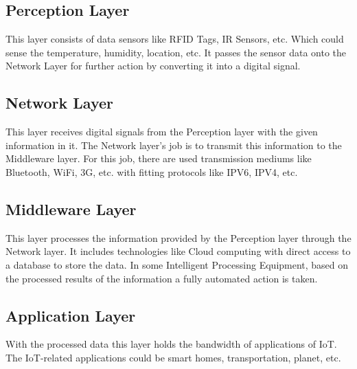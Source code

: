 \documentclass[twoside,twocolumn]{article}
\begin{document}
    \subsection{Perception Layer}
        \noindent This layer consists of data sensors like RFID Tags, IR Sensors, etc. Which could sense the temperature, humidity, location, etc. It passes the sensor data onto the Network Layer for further action by converting it into a digital signal.
    \subsection{Network Layer}
        \noindent This layer receives digital signals from the Perception layer with the given information in it. The Network layer's job is to transmit this information to the Middleware layer. For this job, there are used transmission mediums like Bluetooth, WiFi, 3G, etc. with fitting protocols like IPV6, IPV4, etc.
    \subsection{Middleware Layer}
        \noindent This layer processes the information provided by the Perception layer through the Network layer. It includes technologies like Cloud computing with direct access to a database to store the data. In some Intelligent Processing Equipment, based on the processed results of the information a fully automated action is taken.
    \subsection{Application Layer}
        \noindent With the processed data this layer holds the bandwidth of applications of IoT. The IoT-related applications could be smart homes, transportation, planet, etc.
\end{document}
